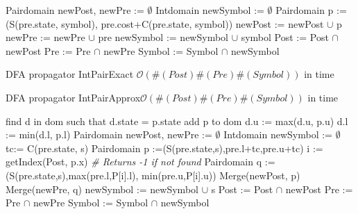 \begin{algorithm}[H]
\begin{algorithmic}[1]
\State Pairdomain newPost, newPre := $\emptyset$
\State Intdomain newSymbol := $\emptyset$
		\State Pairdomain p := (S(pre.state, symbol), pre.cost+C(pre.state, symbol))
			\State newPost := newPost $\cup$ p
			\State newPre := newPre $\cup$ pre
			\State newSymbol := newSymbol $\cup$ symbol 
		\EndIf
	\EndFor
\EndFor
\State Post := Post $\cap$ newPost
\State Pre := Pre $\cap$ newPre
\State Symbol := Symbol $\cap$ newSymbol
\EndProcedure
\end{algorithmic}
\caption{DFA propagator IntPairExact \newline
 $\mathcal{O}(\#(Post)\#(Pre)\#(Symbol))$ in time}
\label{fig:algexact}
\end{algorithm}
\begin{algorithm}[H]
\label{fig:algapprox}
\caption{DFA propagator IntPairApprox\newline $\mathcal{O}(\#(Post)\#(Pre)\#(Symbol))$ in time}
\begin{algorithmic}[1]
	\State find d in dom such that d.state = p.state
		\State add p to dom
	\Else	
		\State d.u := max(d.u, p.u)
		\State d.l := min(d.l, p.l)
	\EndIf
\EndProcedure
{}
\State Pairdomain newPost, newPre := $\emptyset$
\State Intdomain newSymbol := $\emptyset$
		\State tc:= C(pre.state, s)
		\State Pairdomain p :=(S(pre.state,s),pre.l+tc,pre.u+tc)
		\State i := getIndex(Post, p.x) \textit{\# Returns -1 if not found}
		\State Pairdomain q :=(S(pre.state,s),max(pre.l,P[i].l), min(pre.u,P[i].u))
			\State Merge(newPost, p)
			\State Merge(newPre, q)
			\State newSymbol := newSymbol $\cup$ s
		\EndIf
	\EndFor
\EndFor
\State Post := Post $\cap$ newPost
\State Pre := Pre $\cap$ newPre
\State Symbol := Symbol $\cap$ newSymbol
\EndProcedure
\end{algorithmic}
\end{algorithm}
